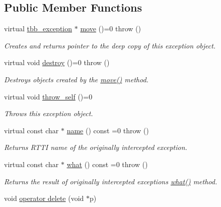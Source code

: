 \subsection*{Public Member Functions}
\begin{DoxyCompactItemize}
\item 
virtual \hyperlink{classtbb_1_1tbb__exception}{tbb\+\_\+exception} $\ast$ \hyperlink{classtbb_1_1tbb__exception_a4bd4ba0d501021013d1473d21b020b69}{move} ()=0  throw ()
\begin{DoxyCompactList}\small\item\em Creates and returns pointer to the deep copy of this exception object. \end{DoxyCompactList}\item 
virtual void \hyperlink{classtbb_1_1tbb__exception_ad3bc09bf78c33f19a0bcdf882fdf9d41}{destroy} ()=0  throw ()
\begin{DoxyCompactList}\small\item\em Destroys objects created by the \hyperlink{classtbb_1_1tbb__exception_a4bd4ba0d501021013d1473d21b020b69}{move()} method. \end{DoxyCompactList}\item 
virtual void \hyperlink{classtbb_1_1tbb__exception_ae45c08d36c7ec7ae91785da3515a8828}{throw\+\_\+self} ()=0
\begin{DoxyCompactList}\small\item\em Throws this exception object. \end{DoxyCompactList}\item 
\hypertarget{classtbb_1_1tbb__exception_ad9df72967f0a20950970dd2859a75e7b}{}virtual const char $\ast$ \hyperlink{classtbb_1_1tbb__exception_ad9df72967f0a20950970dd2859a75e7b}{name} () const  =0  throw ()\label{classtbb_1_1tbb__exception_ad9df72967f0a20950970dd2859a75e7b}

\begin{DoxyCompactList}\small\item\em Returns R\+T\+T\+I name of the originally intercepted exception. \end{DoxyCompactList}\item 
\hypertarget{classtbb_1_1tbb__exception_aea7ddbacd1c18034aab6ac86ad2473d4}{}virtual const char $\ast$ \hyperlink{classtbb_1_1tbb__exception_aea7ddbacd1c18034aab6ac86ad2473d4}{what} () const  =0  throw ()\label{classtbb_1_1tbb__exception_aea7ddbacd1c18034aab6ac86ad2473d4}

\begin{DoxyCompactList}\small\item\em Returns the result of originally intercepted exception\textquotesingle{}s \hyperlink{classtbb_1_1tbb__exception_aea7ddbacd1c18034aab6ac86ad2473d4}{what()} method. \end{DoxyCompactList}\item 
void \hyperlink{classtbb_1_1tbb__exception_a6a973c37078afedf7d457ff4704bf8cd}{operator delete} (void $\ast$p)
\end{DoxyCompactItemize}


